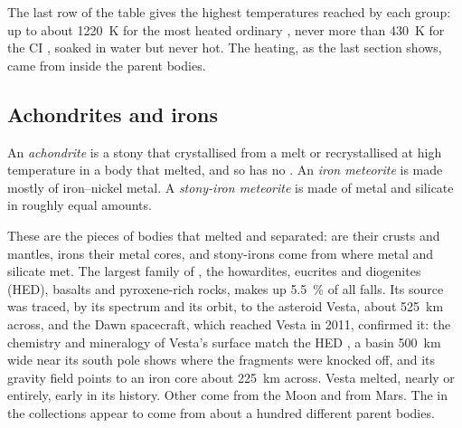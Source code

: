 The last row of the table gives the highest temperatures reached by each group:
up to about \qty{1220}{K} for the most heated ordinary , never more
than \qty{430}{K} for the CI , soaked in water but never hot. The
heating, as the last section shows, came from inside the parent bodies.

\subsection{Achondrites and irons}

\begin{definition}
\label{def:b2:planet-formation-meteorites:classes}
An \emph{achondrite} is a stony  that crystallised
from a melt or recrystallised at high temperature in a body that melted, and
so has no . An \emph{iron meteorite} is made
mostly of iron--nickel metal. A \emph{stony-iron
meteorite} is made of metal and silicate in roughly
equal amounts.
\end{definition}

These are the pieces of bodies that melted and separated:  are their
crusts and mantles, irons their metal cores, and stony-irons come from where
metal and silicate met. The largest family of , the howardites,
eucrites and diogenites (HED), basalts and pyroxene-rich rocks, makes up
\qty{5.5}{\percent} of all falls. Its source was traced, by its spectrum and
its orbit, to the asteroid Vesta, about \qty{525}{km} across, and the Dawn
spacecraft, which reached Vesta in 2011, confirmed it: the chemistry
and mineralogy of Vesta's surface match the HED , a basin
\qty{500}{km} wide near its south pole shows where the fragments were knocked
off, and its gravity field points to an iron core about \qty{225}{km} across.
Vesta melted, nearly or entirely, early in its history. Other  come
from the Moon and from Mars. The  in the collections appear to come
from about a hundred different parent bodies.

